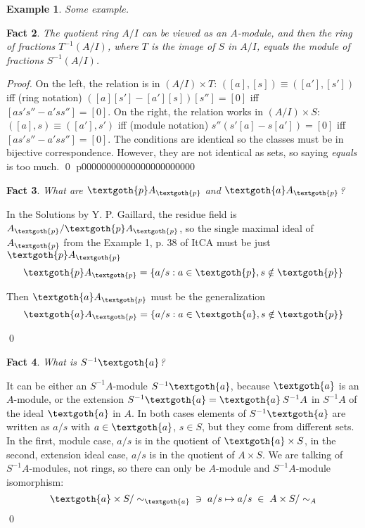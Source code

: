 \documentclass{article}
\newtheorem{theorem}{Fact}[section]
\newtheorem{example}[theorem]{Example}
\begin{document}
\begin{example}
Some example.
\end{example}

\begin{theorem}
The quotient ring $A/I$ can be viewed as an $A$-module, and then the ring of fractions $T^{-1}(A/I)$, where $T$ is the image of $S$ in $A/I$, equals the module of fractions $S^{-1}(A/I)$.
\end{theorem} 

\noindent
\textit{Proof.} On the left, the relation is in $ (A/I) \times T $: $ ([a], [s]) \equiv ([a'], [s']) $ iff (ring notation) $([a][s'] - [a'][s]) [s''] = [0]$ iff $[as's'' - a'ss''] = [0]$. On the right, the relation works in $ (A/I) \times S $: $ ([a], s) \equiv ([a'], s') $ iff (module notation) $s'' (s'[a] - s[a']) = [0]$ iff $[as's'' - a'ss''] = [0]$. The conditions are identical so the classes must be in bijective correspondence. However, they are not identical as sets, so saying \textit{equals} is too much.
\qed
p00000000000000000000000
\begin{theorem}
What are $\textgoth{p}A_\textgoth{p}$ and $\textgoth{a}A_\textgoth{p}$?
\end{theorem}

\noindent
In the Solutions by Y. P. Gaillard, the residue field is $A_\textgoth{p} / \textgoth{p}A_\textgoth{p}$, so the single maximal ideal of $A_\textgoth{p}$ from the Example 1, p. 38 of ItCA must be just $\textgoth{p}A_\textgoth{p}$
\[
  \textgoth{p}A_\textgoth{p} = \{a/s: a \in \textgoth{p}, s \notin \textgoth{p}\}
\]

\noindent
Then $\textgoth{a}A_\textgoth{p}$ must be the generalization
\[
  \textgoth{a}A_\textgoth{p} = \{a/s: a \in \textgoth{a}, s \notin \textgoth{p}\}
\]

\qed

\begin{theorem}
What is $S^{-1}\textgoth{a}$?
\end{theorem}

\noindent
It can be either an $S^{-1}A$-module $S^{-1}\textgoth{a}$, because $\textgoth{a}$ is an $A$-module, or the extension $S^{-1}\textgoth{a} = \textgoth{a} \: S^{-1}A$ in $S^{-1}A$ of the ideal $\textgoth{a}$ in $A$. In both cases elements of $S^{-1}\textgoth{a}$ are written as $a/s$ with $a \in \textgoth{a}$, $s \in S$, but they come from different sets. In the first, module case, $a/s$ is in the quotient of $\textgoth{a} \times S$, in the second, extension ideal case, $a/s$ is in the quotient of $A \times S$. We are talking of $S^{-1}A$-modules, not rings, so there can only be $A$-module and $S^{-1}A$-module isomorphism:
\[
  \textgoth{a} \times S / \sim_\textgoth{a} \; \; \ni \; a/s \mapsto a/s \; \in \; A \times S / \sim_A
\]
\qed
\end{document}
